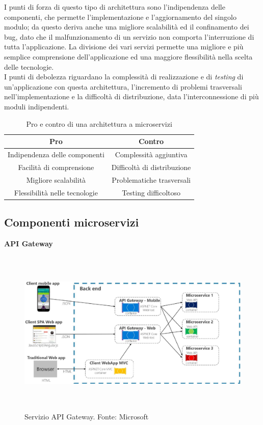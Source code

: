 I punti di forza di questo tipo di architettura sono l'indipendenza delle componenti, che permette l'implementazione e l'aggiornamento del singolo modulo; da questo deriva anche una migliore scalabilità ed il confinamento dei bug, dato che il malfunzionamento di un servizio non comporta l'interruzione di tutta l'applicazione. La divisione dei vari servizi permette una migliore e più semplice comprensione dell'applicazione ed una maggiore flessibilità nella scelta delle tecnologie.\\
I punti di debolezza riguardano la complessità di realizzazione e di \textit{testing} di un'applicazione con questa architettura, l'incremento di problemi trasversali nell'implementazione e la difficoltà di distribuzione, data l'interconnessione di più moduli indipendenti.

\begin{table}[H]
    \centering
    \begin{tabular}{ |c|c| }
        \hline
        Pro & Contro \\
        \hline
        Indipendenza delle componenti & Complessità aggiuntiva \\
        Facilità di comprensione & Difficoltà di distribuzione \\
        Migliore scalabilità & Problematiche trasversali \\
        Flessibilità nelle tecnologie & Testing difficoltoso \\
        \hline
    \end{tabular}
    \caption{Pro e contro di una architettura a microservizi}
\end{table}

\subsection{Componenti microservizi}

\begin{flushleft}
\textbf{{\large API Gateway}}
\end{flushleft}

\begin{figure}[H]
    \centering
    \includegraphics[width=13cm, height=8cm]{images/api-gateway.pdf}
    \caption{Servizio API Gateway. Fonte: Microsoft}
    \label{fig:apigat}
\end{figure}

